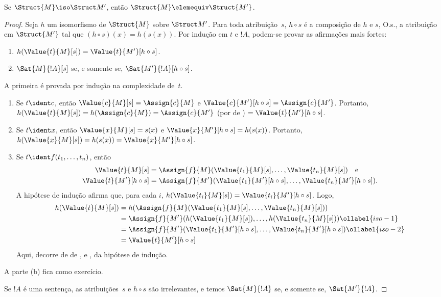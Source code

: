 \documentclass[../../../include/open-logic-section]{subfiles}
\begin{document}
\begin{thm}
Se $\Struct{M} \iso \Struct M'$, então $\Struct{M} \elemequiv
\Struct{M'}$.
\end{thm}

\begin{proof}
Seja $h$ um isomorfismo de $\Struct{M}$ sobre $\Struct M'$. Para toda
atribuição~$s$, $h \circ s$ é a composição de $h$ e $s$, O.s.\@, a
atribuição em $\Struct{M'}$ tal que $(h \circ s)(x) = h(s(x))$. Por
indução em $t$ e $!A$, podem-se provar as afirmações mais fortes:
\begin{enumerate}
  \item[a.] $h(\Value{t}{M}[s]) = \Value{t}{M'}[h\circ s]$.
  \item[b.] $\Sat{M}{!A}[s]$ se, e somente se, $\Sat{M'}{!A}[h \circ s]$.
\end{enumerate}
A primeira é provada por indução na complexidade de~$t$.
\begin{enumerate}
\item Se $t \ident c$, então $\Value{c}{M}[s] = \Assign{c}{M}$ e
  $\Value{c}{M'}[h \circ s] = \Assign{c}{M'}$. Portanto,
  $h(\Value{t}{M}[s]) = h(\Assign{c}{M}) = \Assign{c}{M'}$ (por
   de ) $=
  \Value{t}{M'}[h \circ s]$.
\item Se $t \ident x$, então $\Value{x}{M}[s] = s(x)$ e
  $\Value{x}{M'}[h \circ s] = h(s(x))$. Portanto, $h(\Value{x}{M}[s]) =
  h(s(x)) = \Value{x}{M'}[h \circ s]$.
\item Se $t \ident f(t_1, \dots, t_n)$, então
  \begin{align*}
    \Value{t}{M}[s] & = \Assign{f}{M}(\Value{t_1}{M}[s], \dots, \Value{t_n}{M}[s]) \quad\text{e}\\
  \Value{t}{M'}[h \circ s] & = \Assign{f}{M'}(\Value{t_1}{M'}[h \circ
    s], \dots, \Value{t_n}{M'}[h \circ s]).
  \end{align*}
  A hipótese de indução afirma que, para cada $i$, $h(\Value{t_i}{M}[s])
  = \Value{t_i}{M'}[h\circ s]$. Logo,
  \begin{align}
    h(\Value{t}{M}[s]) 
    & = h(\Assign{f}{M}(\Value{t_1}{M}[s], \dots, \Value{t_n}{M}[s]))\notag\\
    & = \Assign{f}{M'}(h(\Value{t_1}{M}[s]), \dots,
    h(\Value{t_n}{M}[s])) \ollabel{iso-1}\\
    & = \Assign{f}{M'}(\Value{t_1}{M'}[h \circ s], \dots,
    \Value{t_n}{M'}[h \circ s]) \ollabel{iso-2}\\
    & = \Value{t}{M'}[h\circ s] \notag
  \end{align}
  Aqui,  decorre de  de
  , e , da hipótese de indução.
\end{enumerate}
A parte (b) fica como exercício.

Se $!A$ é uma sentença, as atribuições~$s$ e $h \circ s$ são
irrelevantes, e temos $\Sat{M}{!A}$ se, e somente se, $\Sat{M'}{!A}$.
\end{proof}
\end{document}
